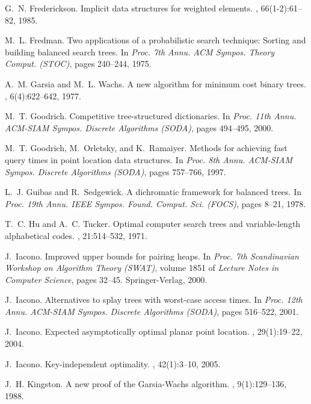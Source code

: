 \documentclass[11pt]{article}
\begin{document}
\begin{thebibliography}{10}
G.~N. Frederickson.
\newblock Implicit data structures for weighted elements.
, 66(1-2):61--82, 1985.

M.~L. Fredman.
\newblock Two applications of a probabilistic search technique: Sorting 
  and building balanced search trees.
\newblock In {\em Proc. 7th Annu. ACM Sympos. Theory Comput. (STOC)}, pages
  240--244, 1975.

A.~M. Garsia and M.~L. Wachs.
\newblock A new algorithm for minimum cost binary trees.
, 6(4):622--642, 1977.

M.~T. Goodrich.
\newblock Competitive tree-structured dictionaries.
\newblock In {\em Proc. 11th Annu. ACM-SIAM Sympos. Discrete Algorithms
  (SODA)}, pages 494--495, 2000.

M.~T. Goodrich, M.~Orletsky, and K.~Ramaiyer.
\newblock Methods for achieving fast query times in point location data
  structures.
\newblock In {\em Proc. 8th Annu. ACM-SIAM Sympos. Discrete Algorithms (SODA)},
  pages 757--766, 1997.

L.~J. Guibas and R.~Sedgewick.
\newblock A dichromatic framework for balanced trees.
\newblock In {\em Proc. 19th Annu. IEEE Sympos. Found. Comput. Sci. (FOCS)},
  pages 8--21, 1978.

T.~C. Hu and A.~C. Tucker.
\newblock Optimal computer search trees and variable-length alphabetical codes.
, 21:514--532, 1971.

J.~Iacono.
\newblock Improved upper bounds for pairing heaps.
\newblock In {\em Proc. 7th Scandinavian Workshop on Algorithm Theory (SWAT)},
  volume 1851 of {\em Lecture Notes in Computer Science}, pages 32--45.
  Springer-Verlag, 2000.

J.~Iacono.
\newblock Alternatives to splay trees with {} worst-case access
  times.
\newblock In {\em Proc. 12th Annu. ACM-SIAM Sympos. Discrete Algorithms
  (SODA)}, pages 516--522, 2001.

J.~Iacono.
\newblock Expected asymptotically optimal planar point location.
, 29(1):19--22, 2004.

J.~Iacono.
\newblock Key-independent optimality.
, 42(1):3--10, 2005.

J.~H. Kingston.
\newblock A new proof of the {G}arsia-{W}achs algorithm.
, 9(1):129--136, 1988.


\end{thebibliography}
\end{document}

